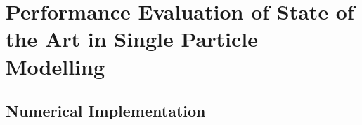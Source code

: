 

\graphicspath{{chapters/spm_analysis/figures/}}

\clearpage
\chapter{Performance Evaluation of State of the Art in Single Particle Modelling}\label{ch:spmanalysis}
\startcontents[chapters]

\bigskip


% 

% 


\section{Numerical Implementation}\label{sec:numericalimplementation}


% 


% 

% 

